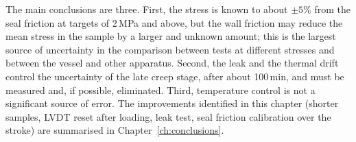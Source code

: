 The main conclusions are three. First, the stress is known to about $\pm5\%$ from the seal friction at targets of 2\,MPa and above, but the wall friction may reduce the mean stress in the sample by a larger and unknown amount; this is the largest source of uncertainty in the comparison between tests at different stresses and between the vessel and other apparatus. Second, the leak and the thermal drift control the uncertainty of the late creep stage, after about 100\,min, and must be measured and, if possible, eliminated. Third, temperature control is not a significant source of error. The improvements identified in this chapter (shorter samples, LVDT reset after loading, leak test, seal friction calibration over the stroke) are summarised in Chapter~\ref{ch:conclusions}.
